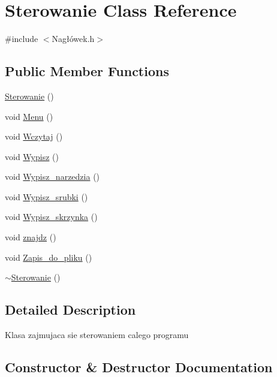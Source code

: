 \hypertarget{class_sterowanie}{}\section{Sterowanie Class Reference}
\label{class_sterowanie}


{\ttfamily \#include $<$Nagłówek.\+h$>$}

\subsection*{Public Member Functions}
\begin{DoxyCompactItemize}
\item 
\mbox{\hyperlink{class_sterowanie_aa583fe9aa2a8cf2ef0bdaef4ff1f63fe}{Sterowanie}} ()
\item 
void \mbox{\hyperlink{class_sterowanie_a6134abccc542aa29b0b0d7c49e252033}{Menu}} ()
\item 
void \mbox{\hyperlink{class_sterowanie_a98e679db65380008ee5c4315bcdea4ff}{Wczytaj}} ()
\item 
void \mbox{\hyperlink{class_sterowanie_a13ce815612492fcc3837c7779def228e}{Wypisz}} ()
\item 
void \mbox{\hyperlink{class_sterowanie_ab11ff3f1364a7b9bb115e927f217f372}{Wypisz\+\_\+narzedzia}} ()
\item 
void \mbox{\hyperlink{class_sterowanie_a2cfe2301e3be2dca7eafb8619a35adb6}{Wypisz\+\_\+srubki}} ()
\item 
void \mbox{\hyperlink{class_sterowanie_a4b0434e74486dfb72bfdc81e93e3c74a}{Wypisz\+\_\+skrzynka}} ()
\item 
void \mbox{\hyperlink{class_sterowanie_a632b8bffe5b03b03564cf3e1aa02dba1}{znajdz}} ()
\item 
void \mbox{\hyperlink{class_sterowanie_aa2c9acc434f34354fe40243b53c295ee}{Zapis\+\_\+do\+\_\+pliku}} ()
\item 
\mbox{\hyperlink{class_sterowanie_ae407297205e8e717b1133762439d8a66}{$\sim$\+Sterowanie}} ()
\end{DoxyCompactItemize}


\subsection{Detailed Description}
Klasa zajmujaca sie sterowaniem calego programu 

\subsection{Constructor \& Destructor Documentation}
\mbox{\label{class_sterowanie_aa583fe9aa2a8cf2ef0bdaef4ff1f63fe}} 
